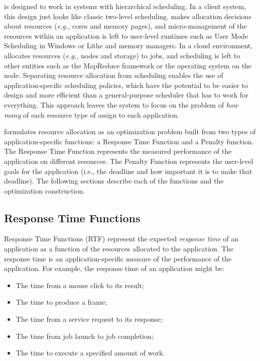 \pacora is designed to work in systems with hierarchical scheduling.  In a client system, this design just looks like classic two-level scheduling.  \pacora makes allocation decisions about resources (\emph{e.g.,} cores and memory pages), and micro-management of the resources within an application is left to user-level runtimes such as User Mode Scheduling in Windows\cite{um_sched} or Lithe\cite{lithe} and memory managers.  In a cloud environment, \pacora allocates resources (\emph{e.g.,} nodes and storage) to jobs, and scheduling is left to other entities such as the MapReduce framework\cite{mapreduce} or the operating system on the node.  Separating resource allocation from scheduling enables the use of application-specific scheduling policies, which have the potential to be easier to design and more efficient than a general-purpose scheduler that has to work for everything.   This approach leaves the system to focus on the problem of \emph{how many} of each resource type of assign to each application. 



\pacora formulates resource allocation as an optimization problem built from two types of application-specific functions: a Response Time Function and a Penalty function. The Response Time Function represents the measured performance of the application on different resources.  The Penalty Function represents the user-level goals for the application (i.e., the deadline and how important it is to make that deadline). The following sections describe each of the functions and the optimization construction.

\subsection*{Response Time Functions}

Response Time Functions (RTF) represent the expected \emph{response time} of an application as a function of the resources allocated to the application. The response time is an application-specific measure of the performance of the application.
    For example, the response time of an application might be:
    \begin{itemize}\itemsep0pt \parskip0pt 
    \item The time from a mouse click to its result;
    \item The time to produce a frame;
    \item The time from a service request to its response;
    \item The time from job launch to job completion;
    \item The time to execute a specified amount of work.
    \end{itemize}
    
